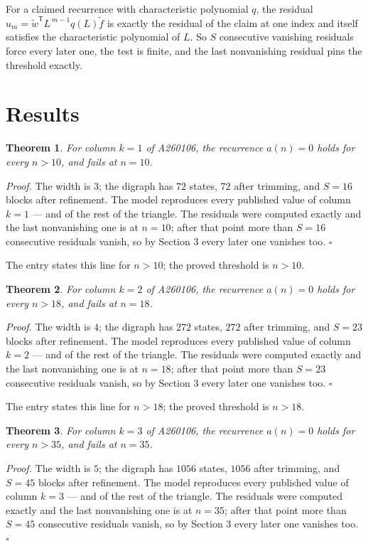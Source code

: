 \documentclass[11pt]{article}
\newtheorem{theorem}{Theorem}
\theoremstyle{definition}
\begin{document}
For a claimed recurrence with characteristic polynomial $q$, the residual $u_m = \tilde w^{\mathsf T}L^{\,m-1}q(L)\tilde f$ is exactly the residual of the claim at one index and itself satisfies the characteristic polynomial of $L$. So $S$ consecutive vanishing residuals force every later one, the test is finite, and the last nonvanishing residual pins the threshold exactly.

\section{Results}

\begin{theorem} For column $k = 1$ of A260106, the recurrence $a(n) = 0$ holds for every $n > 10$, and fails at $n = 10$.\end{theorem}

{\itshape Proof.} The width is $3$; the digraph has $72$ states, $72$ after trimming, and $S = 16$ blocks after refinement. The model reproduces every published value of column $k = 1$ --- and of the rest of the triangle. The residuals were computed exactly and the last nonvanishing one is at $n = 10$; after that point more than $S = 16$ consecutive residuals vanish, so by Section 3 every later one vanishes too. $\square$

The entry states this line for $n > 10$; the proved threshold is $n > 10$.

\begin{theorem} For column $k = 2$ of A260106, the recurrence $a(n) = 0$ holds for every $n > 18$, and fails at $n = 18$.\end{theorem}

{\itshape Proof.} The width is $4$; the digraph has $272$ states, $272$ after trimming, and $S = 23$ blocks after refinement. The model reproduces every published value of column $k = 2$ --- and of the rest of the triangle. The residuals were computed exactly and the last nonvanishing one is at $n = 18$; after that point more than $S = 23$ consecutive residuals vanish, so by Section 3 every later one vanishes too. $\square$

The entry states this line for $n > 18$; the proved threshold is $n > 18$.

\begin{theorem} For column $k = 3$ of A260106, the recurrence $a(n) = 0$ holds for every $n > 35$, and fails at $n = 35$.\end{theorem}

{\itshape Proof.} The width is $5$; the digraph has $1056$ states, $1056$ after trimming, and $S = 45$ blocks after refinement. The model reproduces every published value of column $k = 3$ --- and of the rest of the triangle. The residuals were computed exactly and the last nonvanishing one is at $n = 35$; after that point more than $S = 45$ consecutive residuals vanish, so by Section 3 every later one vanishes too. $\square$
\end{document}
